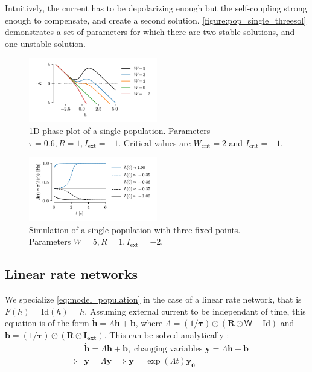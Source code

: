 \documentclass[10pt,conference,compsocconf,a4paper]{IEEEtran}
\renewcommand{\vec}[1]{\boldsymbol{#1}}
\newcommand*{\shortautoref}[1]{%
	\begingroup
	\def\equationautorefname{\textsc{Eq.}}%
	\def\tableautorefname{\textsc{Tab.}}%
	\def\figureautorefname{\textsc{Fig.}}%
	\autoref{#1}%
	\endgroup
}
\begin{document}
		Intuitively, the current has to be depolarizing enough but the self-coupling strong enough to compensate, and create a second solution. \shortautoref{figure:pop_single_threesol} demonstrates a set of parameters for which there are two stable solutions, and one unstable solution.

		\begin{figure}
			\centering
			\includegraphics[width=0.5\textwidth]{figures/pop_single_nonlin_phase.pdf}
			\caption{1D phase plot of a single population. Parameters $\tau = 0.6, R = 1, I_{\text{ext}}= -1$. Critical values are $W_{\text{crit}} = 2$ and $I_{\text{crit}} = -1$.}
			\label{figure:pop_single_nonlin_phase}
		\end{figure}

		\begin{figure}
			\centering
			\includegraphics[width=0.5\textwidth]{figures/pop_single_threesol.pdf}
			\caption{Simulation of a single population with three fixed points. Parameters $W = 5, R = 1, I_{\text{ext}} = -2$.}
			\label{figure:pop_single_threesol}
		\end{figure}

	\subsection{Linear rate networks}
	\label{sec12}

		We specialize \shortautoref{eq:model_population} in the case of a linear rate network, that is $F(h) = \text{Id}(h) = h$. Assuming external current to be independant of time, this equation is of the form $\dot{\vec h} = \Lambda \vec h + \vec b$, where $\Lambda = (1/\vec \tau) \odot (\vec R \odot \mathsf W - \mathrm{Id})$ and $\vec b = (1/\vec \tau) \odot (\vec R \odot \vec{I_{\text{ext}}})$. This can be solved analytically :
\
		\begin{equation*}
			\begin{aligned}
				& \dot{\vec h} = \Lambda \vec h + \vec b, \; \text{changing variables } \vec y = \Lambda \vec h + \vec b \\
				\implies & \dot{\vec y} = \Lambda \vec y \implies \dot{\vec y} = \exp(\Lambda t) \vec{y_0}
			\end{aligned}
		\end{equation*}
\end{document}
